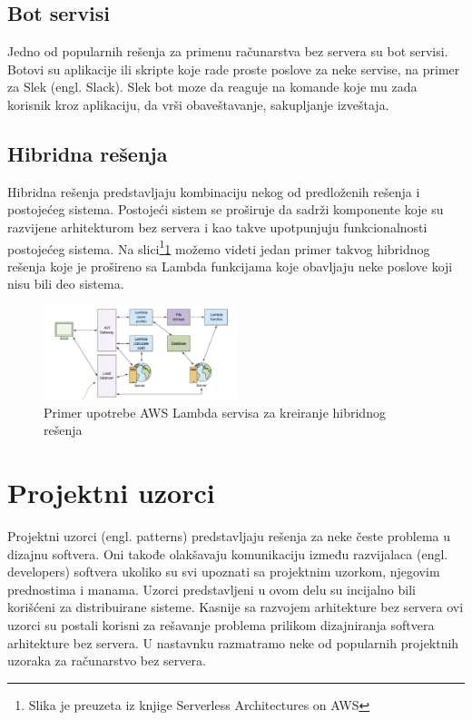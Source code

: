 \documentclass[12pt,oneside]{memoir}
\begin{document}
\subsection{Bot servisi}

Jedno od popularnih rešenja za primenu računarstva bez servera su bot servisi. Botovi su aplikacije ili skripte koje rade proste poslove za neke servise, na primer za Slek (engl. Slack). Slek bot moze da reaguje na komande koje mu zada korisnik kroz aplikaciju, da vrši obaveštavanje, sakupljanje izveštaja. 

\subsection{Hibridna rešenja}

Hibridna rešenja predstavljaju kombinaciju nekog od predloženih rešenja i postojećeg sistema. Postojeći sistem se proširuje da sadrži komponente koje su razvijene arhitekturom bez servera i kao takve upotpunjuju funkcionalnosti postojećeg sistema. Na slici\footnote{Slika je preuzeta iz knjige Serverless Architectures on AWS}\ref{fig:HibridnoResenje} možemo videti jedan primer takvog hibridnog rešenja koje je prošireno sa Lambda funkcijama koje obavljaju neke poslove koji nisu bili deo sistema.

\begin{figure}[!ht]
  \centering
  \includegraphics[width=0.5\textwidth]{Slika 10.png}
  \caption{Primer upotrebe AWS Lambda servisa za kreiranje hibridnog rešenja}
  \label{fig:HibridnoResenje}
\end{figure}

\section{Projektni uzorci}

Projektni uzorci (engl. patterns) predstavljaju rešenja za neke česte problema u dizajnu softvera. Oni takođe olakšavaju komunikaciju između razvijalaca (engl. developers) softvera ukoliko su svi upoznati sa projektnim uzorkom, njegovim prednostima i manama. Uzorci predstavljeni u ovom delu su incijalno bili korišćeni za distribuirane sisteme. Kasnije sa razvojem arhitekture bez servera ovi uzorci su postali korisni za rešavanje problema prilikom dizajniranja softvera arhitekture bez servera\cite{sa}. U nastavnku razmatramo neke od popularnih projektnih uzoraka za računarstvo bez servera.
\end{document}
